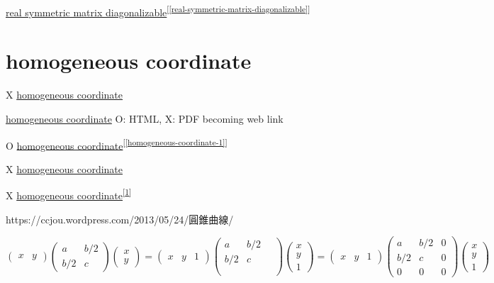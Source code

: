 \documentclass[
]{book}
\theoremstyle{definition}
\theoremstyle{definition}
\theoremstyle{definition}
\theoremstyle{definition}
\theoremstyle{remark}
\begin{document}
\hyperref[real-symmetric-matrix-diagonalizable]{real symmetric matrix diagonalizable}\textsuperscript{{[}\ref{real-symmetric-matrix-diagonalizable}{]}}

\section{homogeneous coordinate}\label{homogeneous-coordinate}

X \href{homogeneous-coordinate-1}{homogeneous coordinate}

\href{homogeneous-coordinate-1.html}{homogeneous coordinate} O: HTML, X: PDF becoming web link

O \hyperref[homogeneous-coordinate-1]{homogeneous coordinate}\textsuperscript{{[}\ref{homogeneous-coordinate-1}{]}}

X \hyperref[homogeneous-coordinate]{homogeneous coordinate}

X \hyperref[homogeneous-coordinate]{homogeneous coordinate}\textsuperscript{{[}\ref{homogeneous-coordinate}{]}}

\begin{CJK}{UTF8}{bsmi}
https://ccjou.wordpress.com/2013/05/24/圓錐曲線/
\end{CJK}

\[
\begin{pmatrix}x & y\end{pmatrix}\begin{pmatrix}a & b/2\\
b/2 & c
\end{pmatrix}\begin{pmatrix}x\\
y
\end{pmatrix}=\begin{pmatrix}x & y & 1\end{pmatrix}\begin{pmatrix}a & b/2 & ~\\
b/2 & c\\
\\
\end{pmatrix}\begin{pmatrix}x\\
y\\
1
\end{pmatrix}=\begin{pmatrix}x & y & 1\end{pmatrix}\begin{pmatrix}a & b/2 & 0\\
b/2 & c & 0\\
0 & 0 & 0
\end{pmatrix}\begin{pmatrix}x\\
y\\
1
\end{pmatrix}
\]
\end{document}
